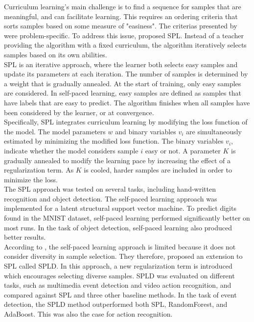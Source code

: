 Curriculum learning's main challenge is to find a sequence for samples that are meaningful, and can facilitate learning. This requires an ordering criteria that sorts samples based on some measure of "easiness". The criterias presented by \cite{Bengio_curriculumlearning} were problem-specific. To address this issue, \cite{Kumar_self_paced_learning} proposed \ac{SPL}. Instead of a teacher providing the algorithm with a fixed curriculum, the algorithm iteratively selects samples based on its own abilities. \\

\ac{SPL} is an iterative approach, where the learner both selects easy samples and update its parameters at each iteration. The number of samples is determined by a weight that is gradually annealed. At the start of training, only easy samples are considered. In self-paced learning, easy samples are defined as samples that have labels that are easy to predict.
The algorithm finishes when all samples have been considered by the learner, or at convergence.\\

Specifically, \ac{SPL} integrates curriculum learning by modifying the loss function of the model. The model parameters $w$ and binary variables $v_{i}$ are simultaneously estimated by minimizing the modified loss function. The binary variables $v_{i}$, indicate whether the model considers sample $i$ easy or not.  A parameter $K$ is gradually annealed to modify the learning pace by increasing the effect of a regularization term. As $K$ is cooled, harder samples are included in order to minimize the loss. \\

The \ac{SPL} approach was tested on several tasks, including hand-written recognition and object detection. The self-paced learning approach was implemented for a latent structural support vector machine. To predict digits found in the MNIST dataset, self-paced learning performed significantly better on most runs. In the task of object detection, self-paced learning also produced better results.  \\

According to \cite{Lu_self-paced_learning_diversity}, the self-paced learning approach is limited because it does not consider diversity in sample selection. They therefore, proposed an extension to \ac{SPL} called \ac{SPLD}. In this approach, a new regularization term is introduced which encourages selecting diverse samples. \ac{SPLD} was evaluated on different tasks, such as multimedia event detection and video action recognition, and compared against \ac{SPL} and three other baseline methods. In the task of event detection, the \ac{SPLD} method outperformed both \ac{SPL}, RandomForest, and AdaBoost. This was also the case for action recognition.\\


